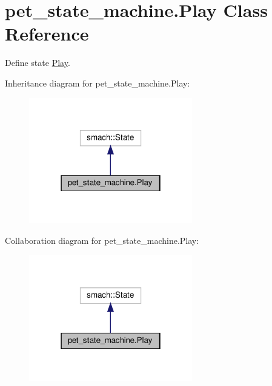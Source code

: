 \hypertarget{classpet__state__machine_1_1Play}{}\section{pet\+\_\+state\+\_\+machine.\+Play Class Reference}
\label{classpet__state__machine_1_1Play}


Define state \hyperlink{classpet__state__machine_1_1Play}{Play}.  




Inheritance diagram for pet\+\_\+state\+\_\+machine.\+Play\+:
\nopagebreak
\begin{figure}[H]
\begin{center}
\leavevmode
\includegraphics[width=202pt]{classpet__state__machine_1_1Play__inherit__graph}
\end{center}
\end{figure}


Collaboration diagram for pet\+\_\+state\+\_\+machine.\+Play\+:
\nopagebreak
\begin{figure}[H]
\begin{center}
\leavevmode
\includegraphics[width=202pt]{classpet__state__machine_1_1Play__coll__graph}
\end{center}
\end{figure}
